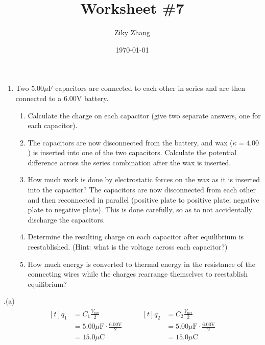 \documentclass[11pt]{article}
\author{Ziky Zhang}
\date{\today}
\title{Worksheet \#7}
\begin{document}
\maketitle
\begin{enumerate}
\item Two \(5.00 \mu \mathrm{F}\) capacitors are connected to each other in series and are then connected to a \(6.00 \mathrm{V}\) battery.
\begin{enumerate}
\item Calculate the charge on each capacitor (give two separate answers, one for each capacitor).
\item The capacitors are now disconnected from the battery, and wax (\(\kappa = 4.00\)) is inserted into one of the two capacitors. Calculate the potential difference across the series combination after the wax is inserted.
\item How much work is done by electrostatic forces on the wax as it is inserted into the capacitor?
The capacitors are now disconnected from each other and then reconnected in parallel (positive plate to positive plate; negative plate to negative plate).  This is done carefully, so as to not accidentally discharge the capacitors.
\item Determine the resulting charge on each capacitor after equilibrium is reestablished. (Hint: what is the voltage across each capacitor?)
\item How much energy is converted to thermal energy in the resistance of the connecting wires while the charges rearrange themselves to reestablish equilibrium?
\end{enumerate}
\end{enumerate}

.(a)
\begin{align*}
\begin{aligned}[t]
q_1 &= C_{1} \frac{V_{\mathrm{net}}}{2} \\
    &= 5.00 \mu \mathrm{F} \cdot \frac{ 6.00 \mathrm{V} }{2} \\
    &= 15.0 \mu \mathrm{C}
\end{aligned}
\qquad
\begin{aligned}[t]
q_2 &= C_{2} \frac{V_{\mathrm{net}}}{2} \\
    &= 5.00 \mu \mathrm{F} \cdot \frac{ 6.00 \mathrm{V} }{2} \\
    &= 15.0 \mu \mathrm{C}
\end{aligned}
\end{align*}
\end{document}
